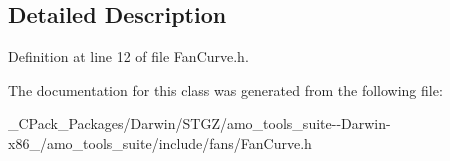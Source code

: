 \subsection{Detailed Description}


Definition at line 12 of file Fan\+Curve.\+h.



The documentation for this class was generated from the following file\+:\begin{DoxyCompactItemize}
\item 
\+\_\+\+C\+Pack\+\_\+\+Packages/\+Darwin/\+S\+T\+G\+Z/amo\+\_\+tools\+\_\+suite-\/-\/\+Darwin-\/x86\+\_/amo\+\_\+tools\+\_\+suite/include/fans/Fan\+Curve.\+h\end{DoxyCompactItemize}
